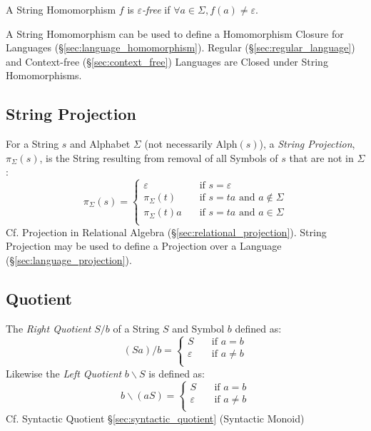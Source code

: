 A String Homomorphism $f$ is \emph{$\varepsilon$-free} if $\forall a
\in \Sigma, f(a) \neq \varepsilon$.

A String Homomorphism can be used to define a Homomorphism Closure for Languages
(\S\ref{sec:language_homomorphism}). Regular (\S\ref{sec:regular_language}) and
Context-free (\S\ref{sec:context_free}) Languages are Closed under String
Homomorphisms.



\subsection{String Projection}\label{sec:string_projection}

For a String $s$ and Alphabet $\Sigma$ (not necessarily $\text{Alph}(s)$), a
\emph{String Projection}, $\pi_{\Sigma}(s)$, is the String resulting from
removal of all Symbols of $s$ that are not in $\Sigma$:
\[
  \pi_{\Sigma}(s) =
  \begin{cases}
    \varepsilon       & \quad \text{if $s = \varepsilon$}\\
    \pi_{\Sigma}(t)   & \quad \text{if $s = ta$ and $a \notin \Sigma$}\\
    \pi_{\Sigma}(t)a  & \quad \text{if $s = ta$ and $a \in \Sigma$}\\
  \end{cases}
\]
\fist Cf. Projection in Relational Algebra (\S\ref{sec:relational_projection}).
String Projection may be used to define a Projection over a Language
(\S\ref{sec:language_projection}).



\subsection{Quotient}\label{sec:string_quotient}

The \emph{Right Quotient} $S / b$ of a String $S$ and Symbol $b$
defined as:
\[
  (Sa)/b =
  \begin{cases}
    S           & \quad \text{if $a = b$}\\
    \varepsilon & \quad \text{if $a \neq b$}\\
  \end{cases}
\]
Likewise the \emph{Left Quotient} $b \backslash S$ is defined as:
\[
  b\backslash(aS) =
  \begin{cases}
    S           & \quad \text{if $a = b$}\\
    \varepsilon & \quad \text{if $a \neq b$}\\
  \end{cases}
\]
\fist Cf. Syntactic Quotient \S\ref{sec:syntactic_quotient} (Syntactic Monoid)



